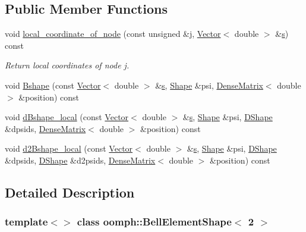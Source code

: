 \subsection*{Public Member Functions}
\begin{DoxyCompactItemize}
\item 
void \hyperlink{classoomph_1_1BellElementShape_3_012_01_4_ad9b2789592d62d6d08c121d795921dd8}{local\+\_\+coordinate\+\_\+of\+\_\+node} (const unsigned \&j, \hyperlink{classoomph_1_1Vector}{Vector}$<$ double $>$ \&\hyperlink{cfortran_8h_ab7123126e4885ef647dd9c6e3807a21c}{s}) const
\begin{DoxyCompactList}\small\item\em Return local coordinates of node j. \end{DoxyCompactList}\item 
void \hyperlink{classoomph_1_1BellElementShape_3_012_01_4_a9bdd842366843435658f1f4dea5b8121}{Bshape} (const \hyperlink{classoomph_1_1Vector}{Vector}$<$ double $>$ \&\hyperlink{cfortran_8h_ab7123126e4885ef647dd9c6e3807a21c}{s}, \hyperlink{classoomph_1_1Shape}{Shape} \&psi, \hyperlink{classoomph_1_1DenseMatrix}{Dense\+Matrix}$<$ double $>$ \&position) const
\item 
void \hyperlink{classoomph_1_1BellElementShape_3_012_01_4_abca489dcf440f32fc0b2c17577d65440}{d\+Bshape\+\_\+local} (const \hyperlink{classoomph_1_1Vector}{Vector}$<$ double $>$ \&\hyperlink{cfortran_8h_ab7123126e4885ef647dd9c6e3807a21c}{s}, \hyperlink{classoomph_1_1Shape}{Shape} \&psi, \hyperlink{classoomph_1_1DShape}{D\+Shape} \&dpsids, \hyperlink{classoomph_1_1DenseMatrix}{Dense\+Matrix}$<$ double $>$ \&position) const
\item 
void \hyperlink{classoomph_1_1BellElementShape_3_012_01_4_a691a47683df33de15960e804474fc03e}{d2\+Bshape\+\_\+local} (const \hyperlink{classoomph_1_1Vector}{Vector}$<$ double $>$ \&\hyperlink{cfortran_8h_ab7123126e4885ef647dd9c6e3807a21c}{s}, \hyperlink{classoomph_1_1Shape}{Shape} \&psi, \hyperlink{classoomph_1_1DShape}{D\+Shape} \&dpsids, \hyperlink{classoomph_1_1DShape}{D\+Shape} \&d2psids, \hyperlink{classoomph_1_1DenseMatrix}{Dense\+Matrix}$<$ double $>$ \&position) const
\end{DoxyCompactItemize}


\subsection{Detailed Description}
\subsubsection*{template$<$$>$\newline
class oomph\+::\+Bell\+Element\+Shape$<$ 2 $>$}



